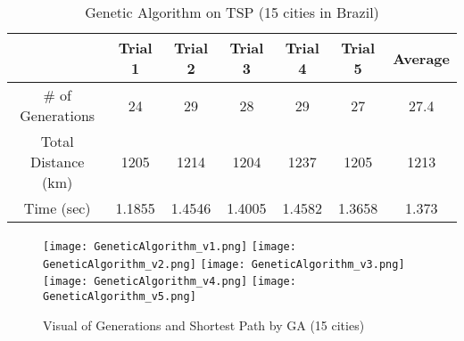 \documentclass{article}
\begin{document}
\begin{table}[H]
\centering
\begin{tabular}{|c|c|c|c|c|c|c|}
\hline
\textit{}           & Trial 1 & Trial 2 & Trial 3 & Trial 4 & Trial 5 & Average \\ \hline
\# of Generations   & 24      & 29      & 28      & 29      & 27      & 27.4    \\ \hline
Total Distance (km) & 1205    & 1214    & 1204    & 1237    & 1205    & 1213    \\ \hline
Time (sec)          & 1.1855  & 1.4546  & 1.4005  & 1.4582  & 1.3658  & 1.373   \\ \hline
\end{tabular}
\caption{Genetic Algorithm on TSP (15 cities in Brazil)}
\label{tab:my-table}
\end{table}

\begin{figure} [H]
    \centering
    \texttt{[image: GeneticAlgorithm\_v1.png]}\hfill
    \texttt{[image: GeneticAlgorithm\_v2.png]}\hfill
    \texttt{[image: GeneticAlgorithm\_v3.png]}\hfill
    \texttt{[image: GeneticAlgorithm\_v4.png]}\hfill
    \texttt{[image: GeneticAlgorithm\_v5.png]}
    \caption{Visual of Generations and Shortest Path by GA (15 cities)}
    \label{fig:my_label}
\end{figure}
\end{document}

